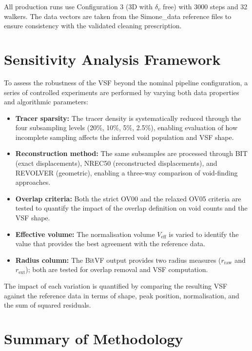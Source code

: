 \documentclass[12pt]{report}
\begin{document}
All production runs use Configuration 3 (3D with $\delta_v$ free) with 3000 steps and 32 walkers. The data vectors are taken from the Simone\_data reference files to ensure consistency with the validated cleaning prescription.


\section{Sensitivity Analysis Framework}
\label{sec:sensitivity}

To assess the robustness of the VSF beyond the nominal pipeline configuration, a series of controlled experiments are performed by varying both data properties and algorithmic parameters:

\begin{itemize}
    \item \textbf{Tracer sparsity:} The tracer density is systematically reduced through the four subsampling levels (20\%, 10\%, 5\%, 2.5\%), enabling evaluation of how incomplete sampling affects the inferred void population and VSF shape.

    \item \textbf{Reconstruction method:} The same subsamples are processed through BIT (exact displacements), NREC50 (reconstructed displacements), and REVOLVER (geometric), enabling a three-way comparison of void-finding approaches.

    \item \textbf{Overlap criteria:} Both the strict OV00 and the relaxed OV05 criteria are tested to quantify the impact of the overlap definition on void counts and the VSF shape.

    \item \textbf{Effective volume:} The normalisation volume $V_\mathrm{eff}$ is varied to identify the value that provides the best agreement with the reference data.

    \item \textbf{Radius column:} The BitVF output provides two radius measures ($r_\mathrm{raw}$ and $r_\mathrm{ext}$); both are tested for overlap removal and VSF computation.
\end{itemize}

The impact of each variation is quantified by comparing the resulting VSF against the reference data in terms of shape, peak position, normalisation, and the sum of squared residuals.


\section{Summary of Methodology}
\end{document}
